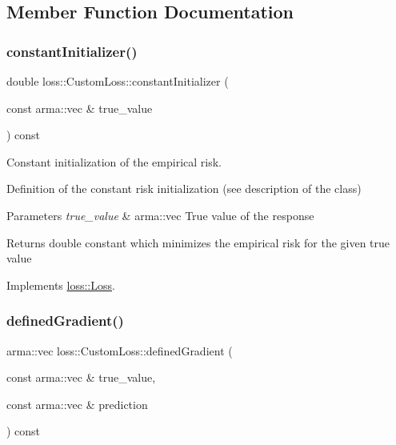 \subsection{Member Function Documentation}
\mbox{\label{classloss_1_1_custom_loss_adf283025a8511731504cd5b620cc8b37}} 
\subsubsection{\texorpdfstring{constant\+Initializer()}{constantInitializer()}}
{\footnotesize\ttfamily double loss\+::\+Custom\+Loss\+::constant\+Initializer (\begin{DoxyParamCaption}\item[{const arma\+::vec \&}]{true\+\_\+value }\end{DoxyParamCaption}) const\hspace{0.3cm}{\ttfamily [virtual]}}



Constant initialization of the empirical risk. 

Definition of the constant risk initialization (see description of the class)


\begin{DoxyParams}{Parameters}
{\em true\+\_\+value} & {\ttfamily arma\+::vec} True value of the response\\
\hline
\end{DoxyParams}
\begin{DoxyReturn}{Returns}
{\ttfamily double} constant which minimizes the empirical risk for the given true value 
\end{DoxyReturn}


Implements \mbox{\hyperlink{classloss_1_1_loss_a65fe7dcd9370e6a549b8d1cc95fc8798}{loss\+::\+Loss}}.

\mbox{\label{classloss_1_1_custom_loss_a3a79dc019e781c2956b52fb8e1cfcc56}} 
\subsubsection{\texorpdfstring{defined\+Gradient()}{definedGradient()}}
{\footnotesize\ttfamily arma\+::vec loss\+::\+Custom\+Loss\+::defined\+Gradient (\begin{DoxyParamCaption}\item[{const arma\+::vec \&}]{true\+\_\+value,  }\item[{const arma\+::vec \&}]{prediction }\end{DoxyParamCaption}) const\hspace{0.3cm}{\ttfamily [virtual]}}



